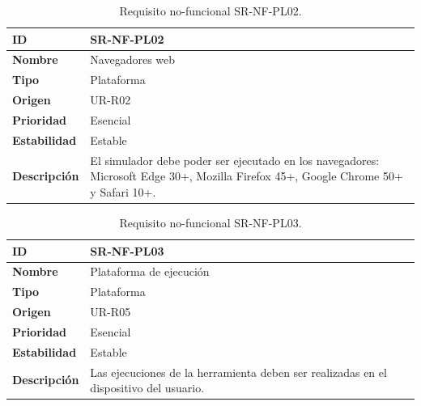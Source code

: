 \begin{center}
\begin{table}[htbp]
\centering
\caption{Requisito no-funcional SR-NF-PL02.}
\begin{tabular}{@{}p{2.5cm} p{9cm}@{}} 
\toprule
\textbf{ID} 				& SR-NF-PL02 \\
\midrule
\textbf{Nombre} 			& Navegadores web \\
\midrule
\textbf{Tipo} 			& Plataforma \\
\midrule
\textbf{Origen} 			& UR-R02 \\
\midrule
\textbf{Prioridad}		& Esencial \\
\midrule
\textbf{Estabilidad} 		& Estable \\
\midrule
\textbf{Descripción} 	& El simulador debe poder ser ejecutado en los navegadores: Microsoft Edge 30+, Mozilla Firefox 45+, Google Chrome 50+ y Safari 10+. \\
\bottomrule
\end{tabular}
\label{tab:srnfpl02}
\end{table}
\end{center}

\begin{center}
\begin{table}[htbp]
\centering
\caption{Requisito no-funcional SR-NF-PL03.}
\begin{tabular}{@{}p{2.5cm} p{9cm}@{}} 
\toprule
\textbf{ID} 				& SR-NF-PL03 \\
\midrule
\textbf{Nombre} 			& Plataforma de ejecución \\
\midrule
\textbf{Tipo} 			& Plataforma \\
\midrule
\textbf{Origen} 			& UR-R05 \\
\midrule
\textbf{Prioridad}		& Esencial \\
\midrule
\textbf{Estabilidad} 		& Estable \\
\midrule
\textbf{Descripción} 	& Las ejecuciones de la herramienta deben ser realizadas en el dispositivo del usuario. \\
\bottomrule
\end{tabular}
\label{tab:srnfpl03}
\end{table}
\end{center}

